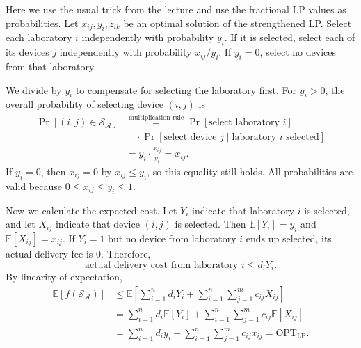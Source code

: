 \documentclass[12pt,a4paper]{article}
\begin{document}
Here we use the usual trick from the lecture and use the fractional LP
values as probabilities. Let $x_{ij},y_i,z_{ik}$ be an optimal solution
of the strengthened LP. Select each laboratory $i$ independently with
probability $y_i$. If it is selected, select each of its devices $j$
independently with probability $x_{ij}/y_i$. If $y_i=0$, select no devices
from that laboratory.

We divide by $y_i$ to compensate for selecting the laboratory first.
For $y_i>0$, the overall probability of selecting device $(i,j)$ is
\[
\begin{aligned}
\Pr[(i,j)\in\mathcal{S}_{\mathcal{A}}]
&\overset{\text{multiplication rule}}{=}
\Pr[\text{select laboratory }i]\\
&\quad\cdot\Pr[\text{select device }j\mid\text{laboratory }i\text{ selected}]\\
&=y_i\cdot\frac{x_{ij}}{y_i}=x_{ij}.
\end{aligned}
\]
If $y_i=0$, then $x_{ij}=0$ by $x_{ij}\leq y_i$, so this equality still
holds. All probabilities are valid because $0\leq x_{ij}\leq y_i\leq1$.

Now we calculate the expected cost. Let $Y_i$ indicate that laboratory
$i$ is selected, and let $X_{ij}$ indicate that device $(i,j)$ is selected.
Then $\mathbb{E}[Y_i]=y_i$ and $\mathbb{E}[X_{ij}]=x_{ij}$.
If $Y_i=1$ but no device from laboratory $i$ ends up selected, its actual
delivery fee is $0$. Therefore,
\[
\text{actual delivery cost from laboratory }i\leq d_iY_i.
\]
By linearity of expectation,
\[
\begin{aligned}
\mathbb{E}[f(\mathcal{S}_{\mathcal{A}})]
&\leq\mathbb{E}\!\left[
\sum_{i=1}^n d_iY_i+\sum_{i=1}^n\sum_{j=1}^m c_{ij}X_{ij}
\right]\\
&=\sum_{i=1}^n d_i\mathbb{E}[Y_i]
+\sum_{i=1}^n\sum_{j=1}^m c_{ij}\mathbb{E}[X_{ij}]\\
&=\sum_{i=1}^n d_i y_i+\sum_{i=1}^n\sum_{j=1}^m c_{ij}x_{ij}
=\mathrm{OPT}_{\mathrm{LP}}.
\end{aligned}
\]
\end{document}
